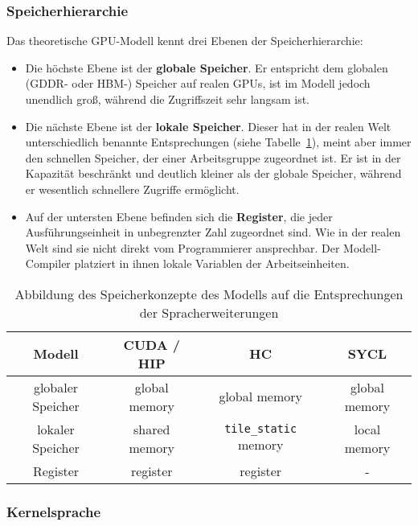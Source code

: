 \subsubsection{Speicherhierarchie}
\label{methoden:konzepte:speicher}

Das theoretische GPU-Modell kennt drei Ebenen der Speicherhierarchie:

\begin{itemize}
    \item Die höchste Ebene ist der \textbf{globale Speicher}. Er entspricht dem
          globalen (GDDR- oder HBM-) Speicher auf realen GPUs, ist im Modell
          jedoch unendlich groß, während die Zugriffszeit sehr langsam ist.
    \item Die nächste Ebene ist der \textbf{lokale Speicher}. Dieser hat in der
          realen Welt unterschiedlich benannte Entsprechungen
          (siehe Tabelle~\ref{methoden:konzepte:speicher:tabelle}), meint aber
          immer den schnellen Speicher, der einer Arbeitsgruppe zugeordnet ist.
          Er ist in der Kapazität beschränkt und deutlich kleiner als der
          globale Speicher, während er wesentlich schnellere Zugriffe
          ermöglicht.
    \item Auf der untersten Ebene befinden sich die \textbf{Register}, die jeder
          Ausführungseinheit in unbegrenzter Zahl zugeordnet sind. Wie in der
          realen Welt sind sie nicht direkt vom Programmierer ansprechbar. Der
          Modell-Compiler platziert in ihnen lokale Variablen der
          Arbeitseinheiten.
\end{itemize}

\begin{table}[htb]
    \centering
    \begin{tabular}{|c|c|c|c|}
        \hline
        Modell & CUDA / HIP & HC & SYCL\\ \hline
        globaler Speicher & global memory & global memory & global memory\\
        \hline
        lokaler Speicher & shared memory & \texttt{tile\_static} memory &
        local memory \\
        \hline
        Register & register & register & -
    \end{tabular}
    \caption{Abbildung des Speicherkonzepte des Modells auf die Entsprechungen
             der Spracherweiterungen}
    \label{methoden:konzepte:speicher:tabelle}
\end{table}

\subsubsection{Kernelsprache}


